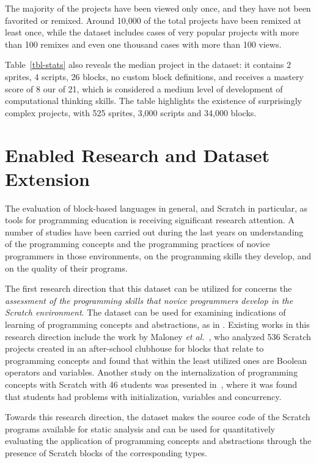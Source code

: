 \documentclass[10pt, conference]{IEEEtran}
\begin{document}
The majority of the projects have been viewed only once, and they have not been favorited or remixed.
Around 10,000 of the total projects have been remixed at least once, while the dataset includes cases of very popular projects with more than 100 remixes and even one thousand cases with more than 100 views. 

Table~\ref{tbl-stats} also reveals the median project in the dataset: it contains 2 sprites, 4 scripts, 26 blocks, no custom block definitions, and receives a mastery score of 8 our of 21, which is considered a medium level of development of computational thinking skills. The table highlights the existence of surprisingly complex projects, with 525 sprites, 3,000 scripts and 34,000 blocks.

\section{Enabled Research and Dataset Extension}

The evaluation of block-based languages in general, and Scratch in particular, as tools for programming education is receiving significant research attention.
A number of studies have been carried out during the last years on understanding of the programming concepts and the programming practices of novice programmers in those environments, on the programming skills they develop, and on the quality of their programs.

The first research direction that this dataset can be utilized for concerns the \textit{assessment of the programming skills that novice programmers develop in the Scratch environment}.
The dataset can be used for examining indications of learning of programming concepts and abstractions, as in \cite{Aivaloglou_2016}.  
Existing works in this research direction include the work by Maloney \emph{et al.}~\cite{Maloney_2008}, who analyzed 536 Scratch projects created in an after-school clubhouse for blocks that relate to programming concepts and found that within the least utilized ones are Boolean operators and variables.
Another study on the internalization of programming concepts with Scratch with 46 students was presented in~\cite{meerbaum-salant_learning_2010}, where it was found that students had problems with initialization, variables and concurrency.

Towards this research direction, the dataset makes the source code of the Scratch programs available for static analysis and can be used for quantitatively evaluating the application of programming concepts and abstractions through the presence of Scratch blocks of the corresponding types.
\end{document}
